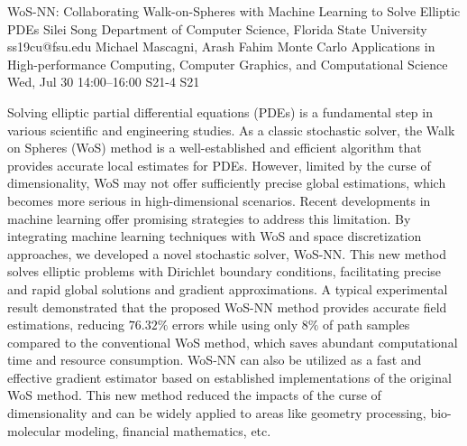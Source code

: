 \begin{talk}
  {WoS-NN: Collaborating Walk-on-Spheres with Machine Learning to Solve Elliptic PDEs}%
  {Silei Song}%
  {Department of Computer Science, Florida State University}%
  {ss19cu@fsu.edu}%
  {Michael Mascagni, Arash Fahim}%
  {Monte Carlo Applications in High-performance Computing, Computer Graphics, and Computational Science}%
  {Wed, Jul 30 14:00–16:00}%
  {S21-4}%
  {S21}%
				
			
Solving elliptic partial differential equations (PDEs) is a fundamental step in various scientific and engineering studies. As a classic stochastic solver, the Walk on Spheres (WoS) method is a well-established and efficient algorithm that provides accurate local estimates for PDEs. However, limited by the curse of dimensionality, WoS may not offer sufficiently precise global estimations, which becomes more serious in high-dimensional scenarios. Recent developments in machine learning offer promising strategies to address this limitation. By integrating machine learning techniques with WoS and space discretization approaches, we developed a novel stochastic solver, WoS-NN. This new method solves elliptic problems with Dirichlet boundary conditions, facilitating precise and rapid global solutions and gradient approximations. A typical experimental result demonstrated that the proposed WoS-NN method provides accurate field estimations, reducing $76.32\%$ errors while using only $8\%$ of path samples compared to the conventional WoS method, which saves abundant computational time and resource consumption. WoS-NN can also be utilized as a fast and effective gradient estimator based on established implementations of the original WoS method. This new method reduced the impacts of the curse of dimensionality and can be widely applied to areas like geometry processing, bio-molecular modeling, financial mathematics, etc.

\medskip

\end{talk}

